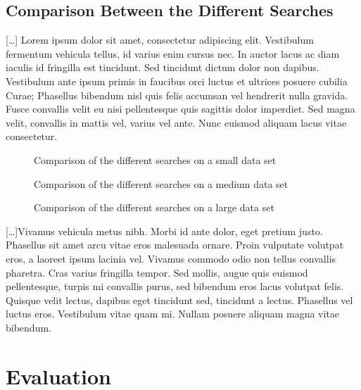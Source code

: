 \documentclass[letterpaper]{article}
\begin{document}
  \subsection{Comparison Between the Different Searches}
    [\ldots] Lorem ipsum dolor sit amet, consectetur adipiscing elit. Vestibulum fermentum vehicula tellus, id varius enim cursus nec. In auctor lacus ac diam iaculis id fringilla est tincidunt. Sed tincidunt dictum dolor non dapibus. Vestibulum ante ipsum primis in faucibus orci luctus et ultrices posuere cubilia Curae; Phasellus bibendum nisl quis felis accumsan vel hendrerit nulla gravida. Fusce convallis velit eu nisi pellentesque quis sagittis dolor imperdiet. Sed magna velit, convallis in mattis vel, varius vel ante. Nunc euismod aliquam lacus vitae consectetur. 
    
    \begin{figure}[H]
  	  \centering
  	  \setlength\fboxsep{0pt}
	  \setlength\fboxrule{0.5pt}
      \caption{Comparison of the different searches on a small data set}
	\end{figure}
	
	\begin{figure}[H]
  	  \centering
  	  \setlength\fboxsep{0pt}
	  \setlength\fboxrule{0.5pt}
      \caption{Comparison of the different searches on a medium data set}
	\end{figure}
	
	\begin{figure}[H]
  	  \centering
  	  \setlength\fboxsep{0pt}
	  \setlength\fboxrule{0.5pt}
      \caption{Comparison of the different searches on a large data set}
	\end{figure}
	
	[\ldots]Vivamus vehicula metus nibh. Morbi id ante dolor, eget pretium justo. Phasellus sit amet arcu vitae eros malesuada ornare. Proin vulputate volutpat eros, a laoreet ipsum lacinia vel. Vivamus commodo odio non tellus convallis pharetra. Cras varius fringilla tempor. Sed mollis, augue quis euismod pellentesque, turpis mi convallis purus, sed bibendum eros lacus volutpat felis. Quisque velit lectus, dapibus eget tincidunt sed, tincidunt a lectus. Phasellus vel luctus eros. Vestibulum vitae quam mi. Nullam posuere aliquam magna vitae bibendum.
  
\section{Evaluation}
  
\end{document}
